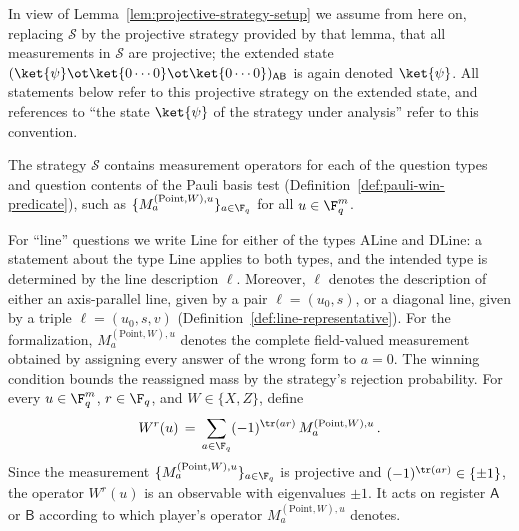 In view of Lemma~\ref{lem:projective-strategy-setup} we assume from here
on, replacing $\mathcal{S}$ by the projective strategy provided by that
lemma, that all measurements in $\mathcal{S}$ are projective; the
extended state
$(\ket{\psi} \ot \ket{0\cdots 0} \ot \ket{0\cdots 0})_{\mathsf{A}\mathsf{B}}$
is again denoted $\ket{\psi}$. All statements below refer to this
projective strategy on the extended state, and references to ``the
state $\ket{\psi}$ of the strategy under analysis'' refer to this
convention.

The strategy $\mathcal{S}$ contains measurement operators for each of the
question types and question contents of the Pauli basis test
(Definition~\ref{def:pauli-win-predicate}), such as
$\{M^{(\mathrm{Point},W),u}_a\}_{a \in \F_q}$ for all $u \in \F_q^m$.

\begin{definition}
	\label{def:strategy-observables}
	\leanok
	For ``line'' questions we write $\mathrm{Line}$ for either of the
	types $\mathrm{ALine}$ and $\mathrm{DLine}$: a statement about the
	type $\mathrm{Line}$ applies to both types, and the intended type is
	determined by the line description $\ell$. Moreover,
	$\ell$ denotes the description of either an axis-parallel line, given by
	a pair $\ell = (u_0, s)$, or a diagonal line, given by a triple
	$\ell = (u_0, s, v)$ (Definition~\ref{def:line-representative}). For
	the formalization, $M^{(\mathrm{Point},W),u}_a$ denotes the complete
	field-valued measurement obtained by assigning every answer of the wrong
	form to $a=0$. The winning condition bounds the reassigned mass by the
	strategy's rejection probability. For
	every $u \in \F_q^m$, $r \in \F_q$, and $W \in \{X, Z\}$, define
	\begin{equation}\label{eq:qld-strat-obs}
		W^r(u) \,=\, \sum_{a \in \F_q} (-1)^{\tr(ar)} \, M^{(\mathrm{Point},W),u}_a\,.
	\end{equation}
	Since the measurement $\{M^{(\mathrm{Point},W),u}_a\}_{a \in \F_q}$ is
	projective and $(-1)^{\tr(ar)} \in \{\pm 1\}$, the operator $W^r(u)$ is
	an observable with eigenvalues $\pm 1$. It acts on register $\mathsf{A}$
	or $\mathsf{B}$ according to which player's operator
	$M^{(\mathrm{Point},W),u}_a$ denotes.
\end{definition}

